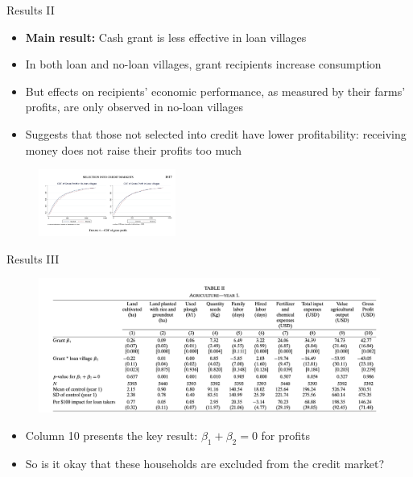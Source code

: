 \documentclass[11pt,notes=hide,aspectratio=169,mathserif]{beamer}
\begin{document}
\begin{frame}{Results II}
\begin{itemize}
    \item \textbf{Main result:} Cash grant is less effective in loan villages
    \pause \item In both loan and no-loan villages, grant recipients increase consumption
    \pause \item But effects on recipients' economic performance, as measured by their farms' profits, are only observed in no-loan villages
    \pause \item Suggests that those not selected into credit have lower profitability: receiving money does not raise their profits too much
\end{itemize}
\begin{figure}
    \centering
    \includegraphics[width=0.4\textwidth]{inputs/fig5.png}
\end{figure}
\end{frame}

\begin{frame}{Results III}
\begin{figure}
    \centering
    \includegraphics[width=\textwidth]{inputs/fig6.png}
\end{figure}
\begin{itemize}
    \item Column 10 presents the key result: $\beta_1+\beta_2 = 0$  for profits
    \pause \item So is it okay that these households are excluded from the credit market? 
\end{itemize}
\end{frame}
\end{document}
